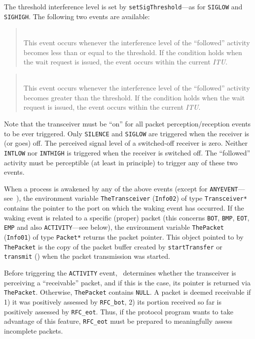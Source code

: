 The threshold interference level is set by {\tt setSigThreshold}---as for
{\tt SIGLOW} and {\tt SIGHIGH}.
The following two events are available:

\begin{quote}
\noindent{}\\ \hspace{0in}
This event occurs whenever the interference level of the ``followed''
activity becomes less than or equal to the threshold.
If the condition holds when the wait request is issued, the event occurs
within the current {\em ITU}.
\end{quote}

\begin{quote}
\noindent{}\\ \hspace{0in}
This event occurs whenever the interference level of the ``followed''
activity becomes greater than the threshold.
If the condition holds when the wait request is issued, the event occurs
within the current {\em ITU}.
\end{quote}

Note that the transceiver must be ``on'' for all packet perception/reception
events to be ever triggered.
Only {\tt SILENCE} and {\tt SIGLOW} are triggered when the receiver is
(or goes) off.
The perceived signal level of a switched-off receiver is zero.
Neither {\tt INTLOW} nor {\tt INTHIGH} is triggered when the receiver is
switched off.
The ``followed'' activity must be perceptible (at least in principle) to
trigger any of these two events.

When a process is awakened by any of the above events (except for
{\tt ANYEVENT}---see~),
the environment variable {\tt TheTransceiver} ({\tt Info02}) of type
{\tt Transceiver*} contains the pointer
to the port on which the waking event has occurred.
If the waking event is related to a specific (proper) packet
(this concerns {\tt BOT}, {\tt BMP}, {\tt EOT}, {\tt EMP} and also
{\tt ACTIVITY}---see below),
the environment variable {\tt ThePacket} ({\tt Info01}) of type {\tt Packet*}
returns the packet pointer.
This object pointed to by {\tt ThePacket} is the copy
of the packet buffer created by {\tt startTransfer}
or {\tt transmit} ()
when the packet transmission was started.

Before triggering the {\tt ACTIVITY} event, \smurph\ determines whether
the transceiver is perceiving a ``receivable'' packet, and if this is the
case, its pointer is returned via {\tt ThePacket}.
Otherwise, {\tt ThePacket} contains {\tt NULL}.
A packet is deemed receivable if 1) it was positively assessed by
{\tt RFC\_bot}, 2) its portion received so far is positively assessed by
{\tt RFC\_eot}.
Thus, if the protocol program wants to take advantage of this
feature, {\tt RFC\_eot} must be prepared to meaningfully assess
incomplete packets.

